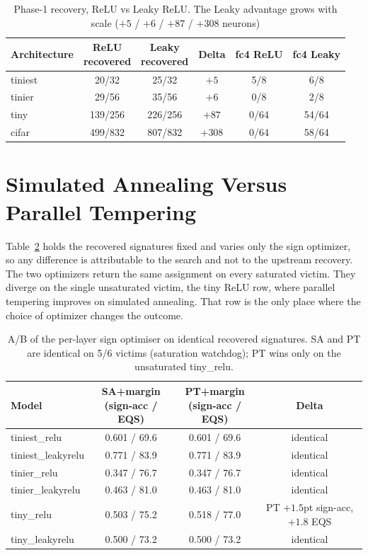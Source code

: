\documentclass[runningheads,orivec]{llncs}
\begin{document}
\begin{table}[H]
\centering
\caption{Phase-1 recovery, ReLU vs Leaky ReLU. The Leaky advantage grows with
scale ($+5$ / $+6$ / $+87$ / $+308$ neurons)}
\label{tab:scaling}
\begin{tabular}{lccccc}
\toprule
Architecture & \makecell{ReLU\\recovered} & \makecell{Leaky\\recovered} & Delta & fc4 ReLU & fc4 Leaky \\
\midrule
tiniest & 20/32  & 25/32  & $+5$  & 5/8  & 6/8  \\
tinier  & 29/56  & 35/56  & $+6$  & 0/8  & 2/8  \\
tiny    & 139/256 & 226/256 & $+87$ & 0/64 & 54/64 \\
cifar   & 499/832 & 807/832 & $+308$ & 0/64 & 58/64 \\
\bottomrule
\end{tabular}
\end{table}

\section{Simulated Annealing Versus Parallel Tempering}
\label{app:exp:abtest}
Table~\ref{tab:abtest} holds the recovered signatures fixed and varies only the sign optimizer, so any difference is attributable to the search and not to the upstream recovery. The two optimizers return the same assignment on every saturated victim. They diverge on the single unsaturated victim, the tiny ReLU row, where parallel tempering improves on simulated annealing. That row is the only place where the choice of optimizer changes the outcome.

\begin{table}[H]
\centering
\caption{A/B of the per-layer sign optimiser on identical recovered signatures.
SA and PT are identical on 5/6 victims (saturation watchdog); PT wins only on the
unsaturated tiny\_relu.}
\label{tab:abtest}
\begin{tabular}{lccc}
\toprule
Model & \makecell{SA+margin\\(sign-acc / EQS)} & \makecell{PT+margin\\(sign-acc / EQS)} & Delta \\
\midrule
tiniest\_relu      & 0.601 / 69.6 & 0.601 / 69.6 & identical \\
tiniest\_leakyrelu & 0.771 / 83.9 & 0.771 / 83.9 & identical \\
tinier\_relu       & 0.347 / 76.7 & 0.347 / 76.7 & identical \\
tinier\_leakyrelu  & 0.463 / 81.0 & 0.463 / 81.0 & identical \\
tiny\_relu         & 0.503 / 75.2 & 0.518 / 77.0 & PT $+1.5$pt sign-acc, $+1.8$ EQS \\
tiny\_leakyrelu    & 0.500 / 73.2 & 0.500 / 73.2 & identical \\
\bottomrule
\end{tabular}
\end{table}
\end{document}
